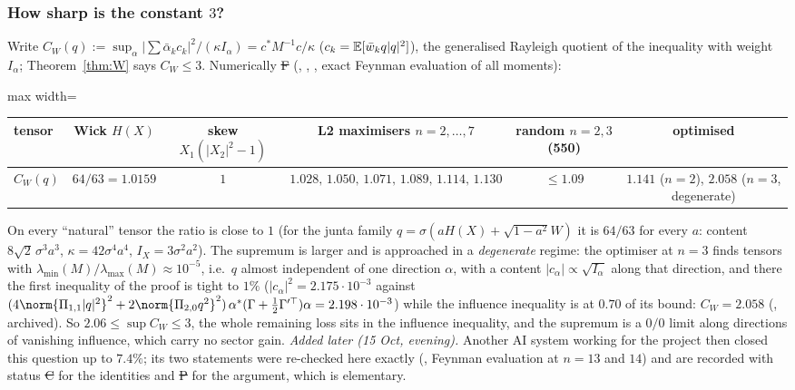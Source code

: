 \subsubsection*{How sharp is the constant $3$?}\label{sec:wct-sharp}
Write $C_W(q):=\sup_\alpha|\sum\bar\alpha_kc_k|^2/(\kappa I_\alpha)=c^*M^{-1}c/\kappa$ ($c_k=\mathbb E[\bar w_kq|q|^2]$), the generalised Rayleigh quotient of the inequality with
weight $I_\alpha$; Theorem~\ref{thm:W} says $C_W\le3$. Numerically \st{F} (, , , exact Feynman evaluation of all moments):
\begin{center}\scriptsize\setlength\tabcolsep{4pt}
\begin{adjustbox}{max width=\linewidth}\begin{tabular}{lccccc}\toprule
tensor & Wick $H(X)$ & skew $X_1(|X_2|^2-1)$ & L2 maximisers $n=2,\dots,7$ & random $n=2,3$ (550) & optimised\\\midrule
$C_W(q)$ & $64/63=1.0159$ & $1$ & $1.028,\,1.050,\,1.071,\,1.089,\,1.114,\,1.130$ & $\le1.09$ & $1.141$ ($n=2$), $2.058$ ($n=3$, degenerate)\\\bottomrule
\end{tabular}\end{adjustbox}
\end{center}
On every ``natural'' tensor the ratio is close to $1$ (for the junta family $q=\sigma(aH(X)+\sqrt{1-a^2}W)$ it is $64/63$ for every $a$: content $8\sqrt2\,\sigma^3a^3$, $\kappa=42\sigma^4a^4$,
$I_X=3\sigma^2a^2$). The supremum is larger and is approached in a \emph{degenerate} regime: the optimiser at $n=3$ finds tensors with $\lambda_{\min}(M)/\lambda_{\max}(M)\approx10^{-5}$,
i.e.\ $q$ almost independent of one direction $\alpha$, with a content $|c_\alpha|\propto\sqrt{I_\alpha}$ along that direction, and there the first inequality of the proof is tight to $1\%$
($|c_\alpha|^2=2.175\cdot10^{-3}$ against $(4\norm{\Pi_{1,1}|q|^2}^2+2\norm{\Pi_{2,0}q^2}^2)\,\alpha^*(\Gamma+\frac12\Gamma'^{\top})\alpha=2.198\cdot10^{-3}$) while the influence inequality is
at $0.70$ of its bound: $C_W=2.058$ (, archived). So $2.06\le\sup C_W\le3$, the whole remaining loss sits in the influence inequality, and the supremum is a $0/0$ limit along
directions of vanishing influence, which carry no sector gain. \emph{Added later (15 Oct, evening).} Another AI system working for the project then closed this question up to $7.4\%$; its two statements were re-checked here exactly
(, Feynman evaluation at $n=13$ and $14$) and are recorded with status \st{C} for the identities and \st{P} for the argument, which is elementary.

